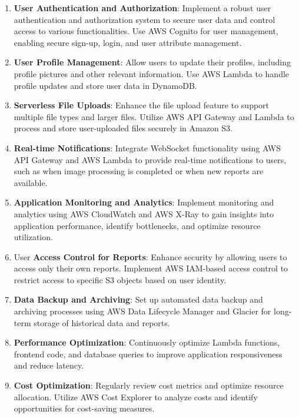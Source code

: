 \begin{enumerate}
    \item \textbf{User Authentication and Authorization}: Implement a robust user authentication and authorization system to secure user data and control access to various functionalities. Use AWS Cognito for user management, enabling secure sign-up, login, and user attribute management.
    
    \item \textbf{User Profile Management}: Allow users to update their profiles, including profile pictures and other relevant information. Use AWS Lambda to handle profile updates and store user data in DynamoDB.

    \item \textbf{Serverless File Uploads}: Enhance the file upload feature to support multiple file types and larger files. Utilize AWS API Gateway and Lambda to process and store user-uploaded files securely in Amazon S3.
    
    \item \textbf{Real-time Notifications}: Integrate WebSocket functionality using AWS API Gateway and AWS Lambda to provide real-time notifications to users, such as when image processing is completed or when new reports are available.
    
    \item \textbf{Application Monitoring and Analytics}: Implement monitoring and analytics using AWS CloudWatch and AWS X-Ray to gain insights into application performance, identify bottlenecks, and optimize resource utilization.
    
    \item User\textbf{ Access Control for Reports}: Enhance security by allowing users to access only their own reports. Implement AWS IAM-based access control to restrict access to specific S3 objects based on user identity.
    
    \item \textbf{Data Backup and Archiving}: Set up automated data backup and archiving processes using AWS Data Lifecycle Manager and Glacier for long-term storage of historical data and reports.
    
    \item \textbf{Performance Optimization}: Continuously optimize Lambda functions, frontend code, and database queries to improve application responsiveness and reduce latency.
    
    \item \textbf{Cost Optimization}: Regularly review cost metrics and optimize resource allocation. Utilize AWS Cost Explorer to analyze costs and identify opportunities for cost-saving measures.
    

\end{enumerate}
